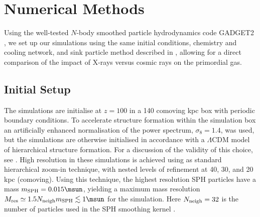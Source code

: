 \section{Numerical Methods}
\label{sec:methods}
Using the well-tested $N$-body smoothed particle hydrodynamics code GADGET2 \citep{Springel2005}, we set up our simulations using the same initial conditions, chemistry and cooling network, and sink particle method described in \citet{Hummeletal2014}, allowing for a direct comparison of the impact of X-rays versus cosmic rays on the primordial gas. 

\subsection{Initial Setup}
\label{setup}
The simulations are initialise at $z=100$ in a 140 comoving kpc box with periodic boundary conditions. To accelerate structure formation within the simulation box an artificially enhanced normalisation of the power spectrum, $\sigma_8 = 1.4$, was used, but the simulations are otherwise initialised in accordance with a $\Lambda$CDM model of hierarchical structure formation. For a discussion of the validity of this choice, see \citet{StacyGreifBromm2010}. High resolution in these simulations is achieved using as standard hierarchical zoom-in technique, with nested levels of refinement at 40, 30, and 20 kpc (comoving).  Using this technique, the highest resolution SPH particles have a mass $m_{\rm SPH} = 0.015\msun$, yielding a maximum mass resolution $M_{\rm res} \simeq 1.5 N_{\rm neigh} m_{\rm SPH} \lesssim 1\msun$ for the simulation.  Here $N_{\rm neigh} = 32$ is the number of particles used in the SPH smoothing kernel \citep{BateBurkert1997}.
